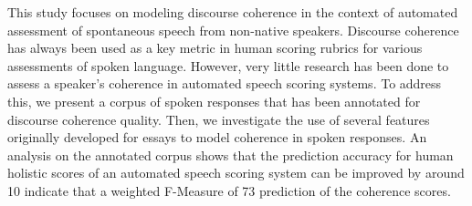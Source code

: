 This study focuses on modeling discourse coherence in the context of automated assessment of spontaneous speech from non-native speakers. Discourse coherence
 has always been used as a key metric in human scoring rubrics for various
 assessments of spoken language. However, very little research has been done to
 assess a speaker's coherence in automated speech scoring systems. To address
 this, we present a corpus of spoken responses that has been annotated for
 discourse coherence quality. Then, we investigate the use of several features
 originally developed for essays to model coherence in spoken responses. An
 analysis on the annotated corpus shows that the prediction accuracy for human
 holistic scores of an automated speech scoring system can be improved by around
 10%
 indicate that a weighted F-Measure of 73%
 prediction of the coherence scores.

